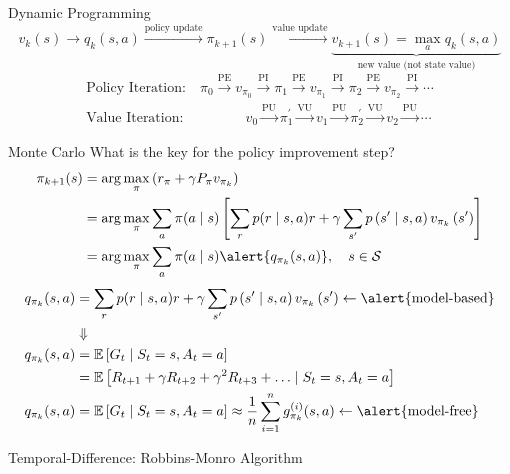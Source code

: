 \documentclass[UTF8, 10pt]{beamer}
\begin{document}
\begin{CJK*}{UTF8}{gbsn}
\begin{frame}{Dynamic Programming}
	$$
	v_{k}(s) \rightarrow q_{k}(s, a)\xrightarrow{\text{policy update}} \pi_{k+1}(s) 
		\xrightarrow{\text{value update}} \underbrace{v_{k+1}(s)=\max _{a} q_{k}(s, a)}_{\text{new value (not state value)}}
	$$
	$$
	\begin{array}{ll}
	\text{Policy Iteration:}\quad \pi_{0} \xrightarrow{\text{PE}} v_{\pi_{0}} \xrightarrow{\text{PI}} \pi_{1} \xrightarrow{\text{PE}} v_{\pi_{1}} \xrightarrow{\text{PI}} \pi_{2} \xrightarrow{\text{PE}} v_{\pi_{2}} \xrightarrow{\text{PI}} \cdots
	\\
	\text{Value Iteration:} \quad\quad\quad\quad\ \ v_{0} \xrightarrow{\text{PU}} \pi_{1}^{\prime} \xrightarrow{\text{VU}} v_{1} \xrightarrow{\text{PU}} \pi_{2}^{\prime} \xrightarrow{\text{VU}} v_{2} \xrightarrow{\text{PU}} \cdots
	\end{array}
	$$
\end{frame}
\begin{frame}{Monte Carlo}
		What is the key for the policy improvement step?
		$$
		\begin{aligned} \pi_{k+1}(s)&=\arg \max _{\pi}\left(r_{\pi}+\gamma P_{\pi} v_{\pi_{k}}\right)\\ & =\arg \max _{\pi} \sum_{a} \pi(a \mid s)\left[\sum_{r} p(r \mid s, a) r+\gamma \sum_{s^{\prime}} p\left(s^{\prime} \mid s, a\right) v_{\pi_{k}}\left(s^{\prime}\right)\right] \\ & =\arg \max _{\pi} \sum_{a} \pi(a \mid s) \alert{q_{\pi_{k}}(s, a)}, \quad s \in \mathcal{S} \end{aligned}
		$$
		$$
		\begin{aligned}
		q_{\pi_{k}}(s, a)&=\sum_{r} p(r \mid s, a) r+\gamma \sum_{s^{\prime}} p\left(s^{\prime} \mid s, a\right) v_{\pi_{k}}\left(s^{\prime}\right) \leftarrow \alert{\text{model-based}}
		\\&\Downarrow\\
		 q_{\pi_{k}}(s, a) & =\mathbb{E}\left[G_{t} \mid S_{t}=s, A_{t}=a\right] \\ & =\mathbb{E}\left[R_{t+1}+\gamma R_{t+2}+\gamma^{2} R_{t+3}+\ldots \mid S_{t}=s, A_{t}=a\right]
		 \\
		 q_{\pi_{k}}(s, a)&=\mathbb{E}\left[G_{t} \mid S_{t}=s, A_{t}=a\right] \approx \frac{1}{n} \sum_{i=1}^{n} g_{\pi_{k}}^{(i)}(s, a) \leftarrow \alert{\text{model-free}}
		 \end{aligned}
		$$
\end{frame}
\begin{frame}{Temporal-Difference: Robbins-Monro Algorithm}
	\begin{itemize}

\end{itemize}
\end{frame}
\end{CJK*}
\end{document}
